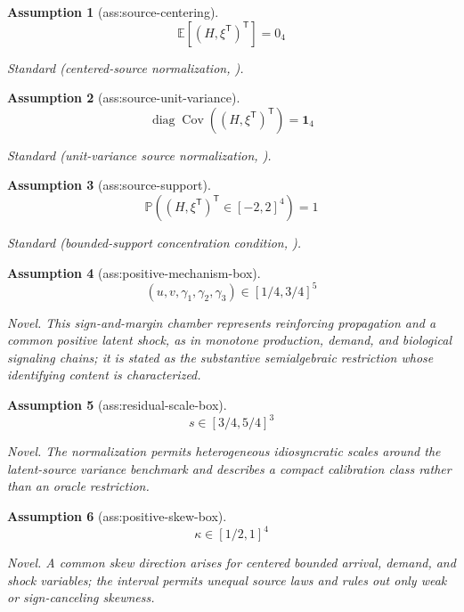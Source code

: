 \documentclass{article}
\newtheorem{assumption}{Assumption}
\begin{document}
\begin{assumption}[ass:source-centering]\label{ass:source-centering}
\[\mathbb E[(H,\xi^{\mathsf T})^{\mathsf T}]=0_4\]
\par\smallskip\noindent\emph{Standard} (centered-source normalization, \cite{caiEtAl2023HigherOrderCumulants}).
\end{assumption}

\begin{assumption}[ass:source-unit-variance]\label{ass:source-unit-variance}
\[\operatorname{diag}\operatorname{Cov}((H,\xi^{\mathsf T})^{\mathsf T})=\mathbf 1_4\]
\par\smallskip\noindent\emph{Standard} (unit-variance source normalization, \cite{caiEtAl2023HigherOrderCumulants}).
\end{assumption}

\begin{assumption}[ass:source-support]\label{ass:source-support}
\[\mathbb P((H,\xi^{\mathsf T})^{\mathsf T}\in[-2,2]^4)=1\]
\par\smallskip\noindent\emph{Standard} (bounded-support concentration condition, \cite{hoeffding1963ProbabilityInequalities}).
\end{assumption}

\begin{assumption}[ass:positive-mechanism-box]\label{ass:positive-mechanism-box}
\[(u,v,\gamma_1,\gamma_2,\gamma_3)\in[1/4,3/4]^5\]
\par\smallskip\noindent\emph{Novel.} This sign-and-margin chamber represents reinforcing propagation and a common positive latent shock, as in monotone production, demand, and biological signaling chains; it is stated as the substantive semialgebraic restriction whose identifying content is characterized.
\end{assumption}

\begin{assumption}[ass:residual-scale-box]\label{ass:residual-scale-box}
\[s\in[3/4,5/4]^3\]
\par\smallskip\noindent\emph{Novel.} The normalization permits heterogeneous idiosyncratic scales around the latent-source variance benchmark and describes a compact calibration class rather than an oracle restriction.
\end{assumption}

\begin{assumption}[ass:positive-skew-box]\label{ass:positive-skew-box}
\[\kappa\in[1/2,1]^4\]
\par\smallskip\noindent\emph{Novel.} A common skew direction arises for centered bounded arrival, demand, and shock variables; the interval permits unequal source laws and rules out only weak or sign-canceling skewness.
\end{assumption}
\end{document}
